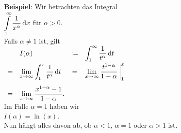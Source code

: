 \noindent
\textbf{Beispiel}: Wir betrachten das Integral 
\\[0.2cm]
\hspace*{1.3cm}
$\displaystyle \int\limits_{1}^\infty \frac{1}{x^\alpha}\, \textrm{d} x$ \quad f\"ur $\alpha > 0$.
\\[0.2cm]
Falls $\alpha \not= 1$ ist,  gilt 
\\[0.2cm]
\hspace*{1.3cm}
$
\begin{array}[t]{clcl}  
  &I(\alpha) & := & \displaystyle \int_{1}^\infty \frac{1}{t^\alpha}\, \textrm{d} t  \\[0.3cm]
= & \displaystyle \lim\limits_{x \rightarrow \infty} \int_1^x \frac{1}{t^\alpha}\, \textrm{d} t 
& = & \displaystyle \lim\limits_{x \rightarrow \infty} \frac{t^{1-\alpha}}{1-\alpha} \,\bigg|_1^x \\[0.5cm]
= & \displaystyle \lim\limits_{x \rightarrow \infty} \frac{x^{1-\alpha}-1}{1-\alpha}.
\end{array}
$
\\[0.3cm]
Im Falle $\alpha = 1$ haben wir
\\[0.2cm]
\hspace*{1.3cm}
$I(\alpha) = \ln(x)$.
\\[0.2cm]
Nun h\"angt alles davon ab, ob $\alpha < 1$, $\alpha = 1$ oder 
 $\alpha > 1$ ist.
